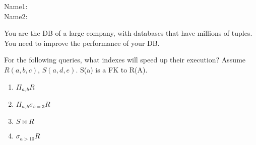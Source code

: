 \documentclass[11pt]{article}
\begin{document}
\huge

\noindent Name1: \\
\noindent Name2:
\vspace{1cm}

You are the DB of a large company, with databases that have millions
of tuples. You need to improve the performance of your DB. 

For the following queries, what indexes will speed up their execution?
Assume $R(a,b,c)$, $S(a, d, e)$. S(a) is a FK to R(A).

\begin{enumerate}
\item $\Pi_{a,b} R$
\vspace{2cm}
\item $\Pi_{a,b} \sigma_{b = 3}R$
\vspace{2cm}
\item $S \bowtie R$
\vspace{2cm}
\item $\sigma_{a > 10}R$
\end{enumerate}
\end{document}
